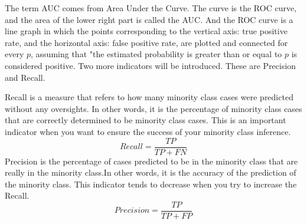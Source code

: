 The term AUC comes from Area Under the Curve.
The curve is the ROC curve, and the area of the lower right part is called the AUC.
And the ROC curve is a line graph in which the points corresponding to the vertical axis: true positive rate, and the horizontal axis: false positive rate, are plotted and connected for every $p$, assuming that "the estimated probability is greater than or equal to $p$ is considered positive.
Two more indicators will be introduced.
These are Precision and Recall.

Recall is a measure that refers to how many minority class cases were predicted without any oversights.
In other words, it is the percentage of minority class cases that are correctly determined to be minority class cases.
This is an important indicator when you want to ensure the success of your minority class inference.
$$
Recall = \frac{TP}{TP + FN}
$$
Precision is the percentage of cases predicted to be in the minority class that are really in the minority class.In other words, it is the accuracy of the prediction of the minority class.
This indicator tends to decrease when you try to increase the Recall.
$$
Precision = \frac{TP}{TP + FP}
$$
